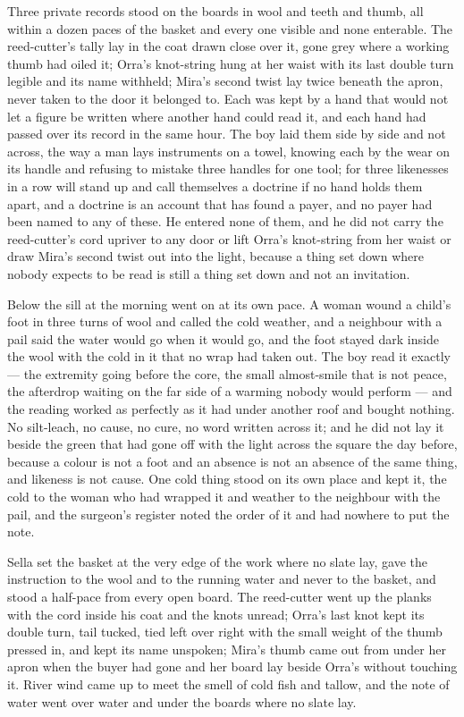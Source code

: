 Three private records stood on the boards in wool and teeth and thumb, all within a dozen paces of the basket and every one visible and none enterable. The reed-cutter's tally lay in the coat drawn close over it, gone grey where a working thumb had oiled it; Orra's knot-string hung at her waist with its last double turn legible and its name withheld; Mira's second twist lay twice beneath the apron, never taken to the door it belonged to. Each was kept by a hand that would not let a figure be written where another hand could read it, and each hand had passed over its record in the same hour. The boy laid them side by side and not across, the way a man lays instruments on a towel, knowing each by the wear on its handle and refusing to mistake three handles for one tool; for three likenesses in a row will stand up and call themselves a doctrine if no hand holds them apart, and a doctrine is an account that has found a payer, and no payer had been named to any of these. He entered none of them, and he did not carry the reed-cutter's cord upriver to any door or lift Orra's knot-string from her waist or draw Mira's second twist out into the light, because a thing set down where nobody expects to be read is still a thing set down and not an invitation.

Below the sill at  the morning went on at its own pace. A woman wound a child's foot in three turns of wool and called the cold weather, and a neighbour with a pail said the water would go when it would go, and the foot stayed dark inside the wool with the cold in it that no wrap had taken out. The boy read it exactly --- the extremity going before the core, the small almost-smile that is not peace, the afterdrop waiting on the far side of a warming nobody would perform --- and the reading worked as perfectly as it had under another roof and bought nothing. No silt-leach, no cause, no cure, no word written across it; and he did not lay it beside the green that had gone off with the light across the square the day before, because a colour is not a foot and an absence is not an absence of the same thing, and likeness is not cause. One cold thing stood on its own place and kept it, the cold to the woman who had wrapped it and weather to the neighbour with the pail, and the surgeon's register noted the order of it and had nowhere to put the note.

Sella set the basket at the very edge of the work where no slate lay, gave the instruction to the wool and to the running water and never to the basket, and stood a half-pace from every open board. The reed-cutter went up the planks with the cord inside his coat and the knots unread; Orra's last knot kept its double turn, tail tucked, tied left over right with the small weight of the thumb pressed in, and kept its name unspoken; Mira's thumb came out from under her apron when the buyer had gone and her board lay beside Orra's without touching it. River wind came up to meet the smell of cold fish and tallow, and the note of water went over water and under the boards where no slate lay.

